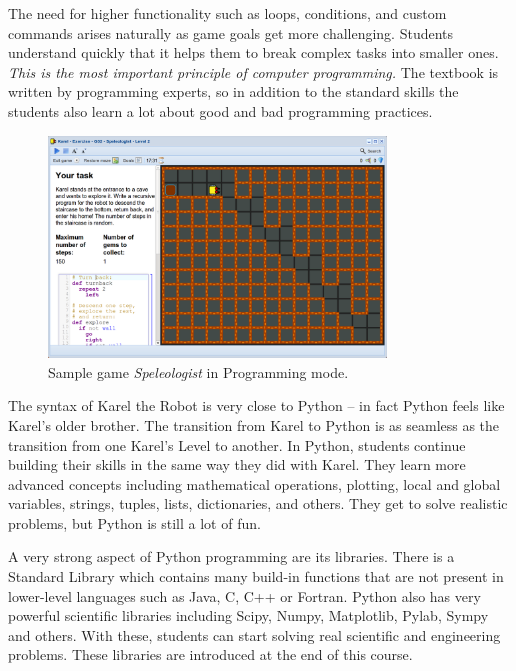 \documentclass[article,A4,12pt]{llncs}
\begin{document}
The need for higher functionality such as loops, conditions, and custom commands arises 
naturally as game goals get more challenging. 
Students understand quickly that it helps them to break complex tasks into smaller 
ones. {\em This is the most important principle of computer 
programming.} The textbook is written by programming experts, so in addition to the 
standard skills the students also learn a lot about good and bad programming practices.

\begin{figure}[!ht]
\begin{center}
\includegraphics[width=0.8\textwidth]{imgk/fore-2.png}
\end{center}
\vspace{-2mm}
\caption{Sample game {\em Speleologist} in Programming mode.}
\label{fig:f2}
\vspace{-4mm}
\end{figure}
\noindent
The syntax of Karel the Robot is very close to Python -- in fact Python feels like Karel's
older brother. The transition from Karel to Python is as seamless as the transition from 
one Karel's Level to another. 
In Python, students continue building their skills in the same way they did with Karel. 
They learn more advanced concepts including mathematical operations, plotting, local and 
global variables, strings, tuples, lists, dictionaries, and others. They get to solve 
realistic problems, but Python is still a lot of fun. 

A very strong aspect of Python programming are its libraries. There is a Standard Library which 
contains many build-in functions that are not present in lower-level languages such as 
Java, C, C++ or Fortran. Python also has very powerful scientific libraries including 
Scipy, Numpy, Matplotlib, Pylab, Sympy and others. With these, students can start solving 
real scientific and engineering problems. These libraries are introduced at the end of this 
course.  
\end{document}
